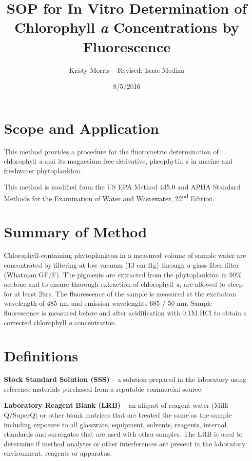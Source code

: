 \documentclass[12pt]{../SOP3_alpha}
\author{Kristy Morris -- Revised: Isaac Medina}
\title{SOP for In Vitro Determination of Chlorophyll \textit{a} Concentrations by Fluorescence}
\date{8/5/2016}
\begin{document}


\maketitle

\section{Scope and Application}

\NP This method provides a procedure for the fluorometric determination of chlorophyll \textit{a} and its magnesium-free derivative, pheophytin \textit{a} in marine and freshwater phytoplankton.

\NP This method is modified from the US EPA Method 445.0 and APHA Standard Methods for the Examination of Water and Wastewater, 22\textsuperscript{nd} Edition. 


\section{Summary of Method}

\NP Chlorophyll-containing phytoplankton in a measured volume of sample water are concentrated by filtering at low vacuum (13 cm Hg) through a glass fiber filter (Whatman GF/F). The pigments are extracted from the phytoplankton in 90\% acetone and to ensure thorough extraction of chlorophyll \textit{a}, are allowed to steep for at least 2hrs. The fluorescence of the sample is measured at the excitation wavelength of 485 nm and emission wavelenghts 685 / 50 nm. Sample fluorescence is measured before and after acidification with 0.1M HCl to obtain a corrected chlorophyll \textit{a} concentration. 


\section{Definitions}
\NP \textbf{Stock Standard Solution (SSS)} -- a solution prepared in the laboratory using reference materials purchased from a reputable commercial source.

\NP \textbf{Laboratory Reagent Blank (LRB)} -- an aliquot of reagent water (Milli-Q/SuperQ) or other blank matrices that are treated the same as the sample including exposure to all glassware, equipment, solvents, reagents, internal standards and surrogates that are used with other samples. The LRB is used to determine if method analytes or other interferences are present in the laboratory environment, reagents or apparatus. 
\end{document}
